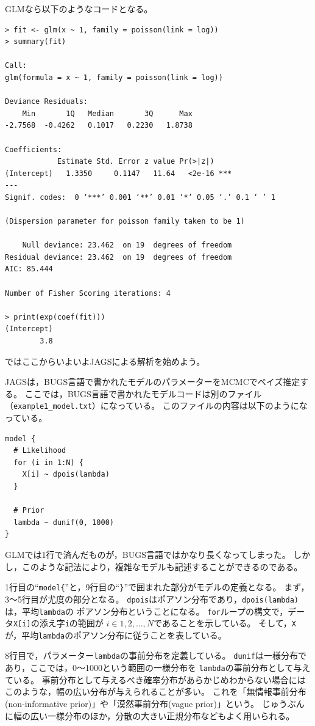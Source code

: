 \documentclass[11pt,uplatex]{jsarticle}
\begin{document}
GLMなら以下のようなコードとなる。
\begin{lstlisting}
> fit <- glm(x ~ 1, family = poisson(link = log))
> summary(fit)

Call:
glm(formula = x ~ 1, family = poisson(link = log))

Deviance Residuals: 
    Min       1Q   Median       3Q      Max  
-2.7568  -0.4262   0.1017   0.2230   1.8738  

Coefficients:
            Estimate Std. Error z value Pr(>|z|)    
(Intercept)   1.3350     0.1147   11.64   <2e-16 ***
---
Signif. codes:  0 ‘***’ 0.001 ‘**’ 0.01 ‘*’ 0.05 ‘.’ 0.1 ‘ ’ 1

(Dispersion parameter for poisson family taken to be 1)

    Null deviance: 23.462  on 19  degrees of freedom
Residual deviance: 23.462  on 19  degrees of freedom
AIC: 85.444

Number of Fisher Scoring iterations: 4

> print(exp(coef(fit)))
(Intercept) 
        3.8 
\end{lstlisting}

ではここからいよいよ\textsf{JAGS}による解析を始めよう。

\textsf{JAGS}は，\textsf{BUGS}言語で書かれたモデルのパラメーターをMCMCでベイズ推定する。
ここでは，\textsf{BUGS}言語で書かれたモデルコードは別のファイル（\texttt{example1\_model.txt}）になっている。
このファイルの内容は以下のようになっている。
\begin{lstlisting}
model {
  # Likelihood
  for (i in 1:N) {
    X[i] ~ dpois(lambda)
  }

  # Prior
  lambda ~ dunif(0, 1000)
}
\end{lstlisting}
%
GLMでは1行で済んだものが，\textsf{BUGS言語}ではかなり長くなってしまった。
しかし，このような記法により，複雑なモデルも記述することができるのである。

1行目の``\texttt{model\{}''と，9行目の``\texttt{\}}''で囲まれた部分がモデルの定義となる。
まず，3〜5行目が尤度の部分となる。
\texttt{dpois}はポアソン分布であり，\texttt{dpois(lambda)}は，平均\texttt{lambda}の
ポアソン分布ということになる。
\texttt{for}ループの構文で，データ\texttt{X[i]}の添え字\texttt{i}の範囲が
$i \in 1, 2, \dots, N$であることを示している。
そして，\texttt{X}が，平均\texttt{lambda}のポアソン分布に従うことを表している。

8行目で，パラメーター\texttt{lambda}の事前分布を定義している。
\texttt{dunif}は一様分布であり，ここでは，0〜1000という範囲の一様分布を
\texttt{lambda}の事前分布として与えている。
事前分布として与えるべき確率分布があらかじめわからない場合には
このような，幅の広い分布が与えられることが多い。
これを「無情報事前分布(non-informative prior)」や「漠然事前分布(vague prior)」という。
じゅうぶんに幅の広い一様分布のほか，分散の大きい正規分布などもよく用いられる。
\end{document}
